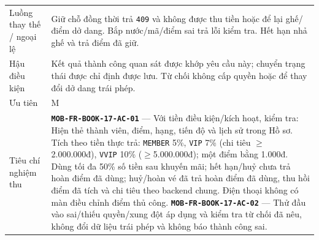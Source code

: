 \begin{longtable}{@{}P{0.23000\SRSWidth}P{0.77000\SRSWidth}@{}}
Luồng thay thế /\allowbreak{} ngoại lệ & Giữ chỗ đồng thời trả \texttt{409} và không được thu tiền hoặc để lại ghế/\allowbreak{}điểm dở dang. Bắp nước/\allowbreak{}mã/\allowbreak{}điểm sai trả lỗi kiểm tra. Hết hạn nhả ghế và trả điểm đã giữ. \\[3pt]
Hậu điều kiện & Kết quả thành công quan sát được khớp yêu cầu này; chuyển trạng thái được chỉ định được lưu. Từ chối không cấp quyền hoặc để thay đổi dở dang trái phép. \\[3pt]
Ưu tiên & M \\[3pt]
Tiêu chí nghiệm thu & \textbf{\texttt{MOB-\allowbreak{}FR-\allowbreak{}BOOK-\allowbreak{}17-\allowbreak{}AC-\allowbreak{}01}} — Với tiền điều kiện/\allowbreak{}kích hoạt, kiểm tra: Hiện thẻ thành viên, điểm, hạng, tiến độ và lịch sử trong Hồ sơ. Tích theo tiền thực trả: \texttt{MEMBER} 5\%, \texttt{VIP} 7\% (chi tiêu \ensuremath{\geq}2.000.000đ), \texttt{VVIP} 10\% (\ensuremath{\geq}5.000.000đ); một điểm bằng 1.000đ. Dùng tối đa 50\% số tiền sau khuyến mãi; hết hạn/\allowbreak{}huỷ chưa trả hoàn điểm đã dùng; huỷ/\allowbreak{}hoàn vé đã trả hoàn điểm đã dùng, thu hồi điểm đã tích và chi tiêu theo backend chung. Điện thoại không có màn điều chỉnh điểm thủ công. \textbf{\texttt{MOB-\allowbreak{}FR-\allowbreak{}BOOK-\allowbreak{}17-\allowbreak{}AC-\allowbreak{}02}} — Thử đầu vào sai/\allowbreak{}thiếu quyền/\allowbreak{}xung đột áp dụng và kiểm tra từ chối đã nêu, không đổi dữ liệu trái phép và không báo thành công sai. \\[3pt]

\end{longtable}
